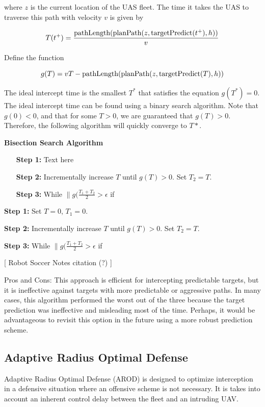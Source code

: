 \documentclass[letterpaper, 10 pt, conference]{ieeeconf}  %
\begin{document}
where $z$ is the current location of the UAS fleet. The time it takes the UAS to traverse this path with velocity $v$ is given by

\[
T(t^+) = \frac{\textnormal{pathLength}(\textnormal{planPath}(z, \textnormal{targetPredict}(t^+),h))}{v}
\]

Define the function

\[
g(T) = vT - \textnormal{pathLength}(\textnormal{planPath}(z, \textnormal{targetPredict}(T),h))
\]

The ideal intercept time is the smallest $T^*$ that satisfies the equation $g(T^*) = 0$. The ideal intercept time can be found using a binary search algorithm. Note that $g(0) < 0$, and that for some $T > 0$, we are guaranteed that $g(T) > 0$. Therefore, the following algorithm will quickly converge to $T*$.
\newline


\textbf{Bisection Search Algorithm}
\begin{enumerate}
\parindent \item [\textbf{Step 1:}] Text here
\item [\textbf{Step 2:}] Incrementally increase $T$ until $g(T) > 0$. Set $T_2 = T$.
\item [\textbf{Step 3:}] While \(\|g(\frac{T_1 + T_2}{2} > \epsilon\) if 

\end{enumerate}

\textbf{Step 1:} Set $T = 0$, $T_1 = 0$.

\textbf{Step 2:} Incrementally increase $T$ until $g(T) > 0$. Set $T_2 = T$.

\textbf{Step 3:} While \(\|g(\frac{T_1 + T_2}{2} > \epsilon\) if 

[ Robot Soccer Notes citation (?) ]

Pros and Cons: This approach is efficient for intercepting predictable targets, but it is ineffective against targets with more predictable or aggressive paths. In many cases, this algorithm performed the worst out of the three because the target prediction was ineffective and misleading most of the time. Perhaps, it would be advantageous to revisit this option in the future using a more robust prediction scheme.


\subsection{Adaptive Radius Optimal Defense}
	Adaptive Radius Optimal Defense (AROD) is designed to optimize interception in a defensive situation where an offensive scheme is not necessary. It is takes into account an inherent control delay between the fleet and an intruding UAV. 
	
\end{document}
